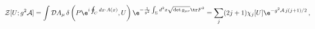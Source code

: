 \begin{equation}
\label{DiskAmplitude}
{\cal Z} [U; g^2 {\cal A}]
=
\int \mathcal{D}A_\mu \,
\delta \left( P \e^{i \oint_C dx \cdot A (x)},U \right)
\e^{
- \frac{1}{g^2} \int_{\Sigma} d^2 x \sqrt {\det g_{\mu\nu}} \tr F^2
}
=
\sum_{j} (2j + 1) \chi_{j} [U]
\e^{
- {g^2 {\cal A}} \, j(j + 1)/2
} \, ,
\end{equation}

